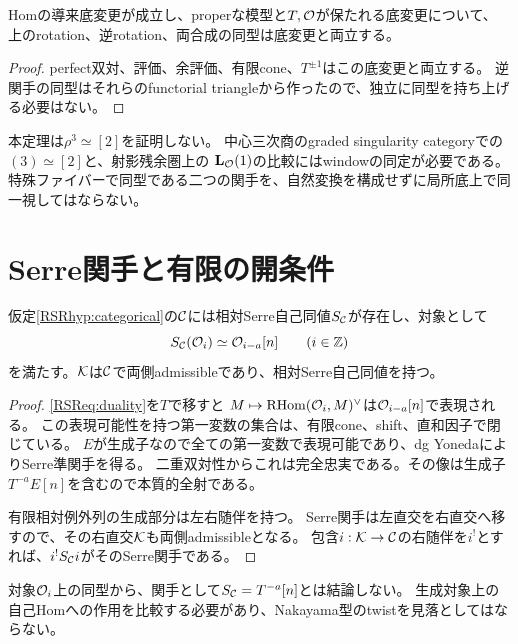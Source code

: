 \begin{corollary}[底変更]\label{RSRcor:rotation-bc}
Homの導来底変更が成立し、properな模型と$T,\mathcal O$が保たれる底変更について、
上のrotation、逆rotation、両合成の同型は底変更と両立する。
\end{corollary}
\begin{proof}
perfect双対、評価、余評価、有限cone、$T^{\pm1}$はこの底変更と両立する。
逆関手の同型はそれらのfunctorial triangleから作ったので、独立に同型を持ち上げる必要はない。
\end{proof}

\begin{remark}[周期性とは異なる]
本定理は$\rho^3\simeq[2]$を証明しない。
中心三次商のgraded singularity categoryでの$(3)\simeq[2]$と、射影残余圏上の
$\mathbf L_{\mathcal O}(1)$の比較にはwindowの同定が必要である。
特殊ファイバーで同型である二つの関手を、自然変換を構成せずに局所底上で同一視してはならない。
\end{remark}

\section{Serre関手と有限の開条件}\label{RSRsec:serre}
\begin{proposition}[局所Serre関手]\label{RSRprop:serre}
仮定\ref{RSRhyp:categorical}の$\mathcal C$には相対Serre自己同値$S_{\mathcal C}$が存在し、対象として
\[
 S_{\mathcal C}(\mathcal O_i)\simeq\mathcal O_{i-a}[n]\qquad(i\in\mathbb Z)
\]
を満たす。$\mathcal K$は$\mathcal C$で両側admissibleであり、相対Serre自己同値を持つ。
\end{proposition}
\begin{proof}
\eqref{RSReq:duality}を$T$で移すと
$M\mapsto\operatorname{RHom}(\mathcal O_i,M)^\vee$は$\mathcal O_{i-a}[n]$で表現される。
この表現可能性を持つ第一変数の集合は、有限cone、shift、直和因子で閉じている。
$E$が生成子なので全ての第一変数で表現可能であり、dg YonedaによりSerre準関手を得る。
二重双対性からこれは完全忠実である。その像は生成子$T^{-a}E[n]$を含むので本質的全射である。

有限相対例外列の生成部分は左右随伴を持つ。
Serre関手は左直交を右直交へ移すので、その右直交$\mathcal K$も両側admissibleとなる。
包含$i:\mathcal K\to\mathcal C$の右随伴を$i^!$とすれば、$i^!S_{\mathcal C}i$がそのSerre関手である。
\end{proof}

\begin{remark}
対象$\mathcal O_i$上の同型から、関手として$S_{\mathcal C}=T^{-a}[n]$とは結論しない。
生成対象上の自己Homへの作用を比較する必要があり、Nakayama型のtwistを見落としてはならない。
\end{remark}

